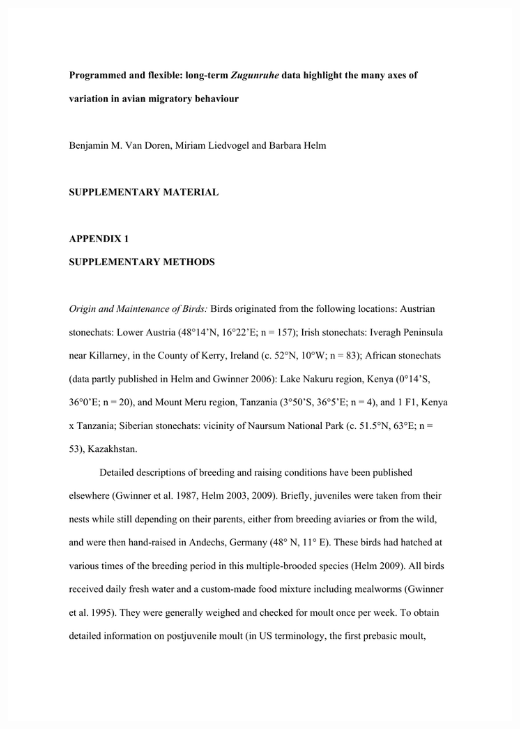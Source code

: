 \documentclass[a4paper, twoside]{templates/ociamthesis}
\begin{document}
\includegraphics[width=1\linewidth]{pdf_chapters/zug/zug_supp_crop_Part2}
\end{document}
